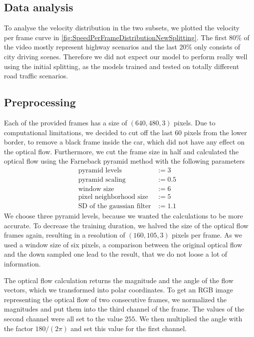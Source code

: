 \documentclass[conference]{IEEEtran}
\begin{document}
\subsection{Data analysis}
To analyse the velocity distribution in the two subsets, we plotted the velocity per frame curve in 
\cref{fig:SpeedPerFrameDistributionNewSplitting}. The first 80$\%$ of the video mostly represent highway scenarios 
and the last 20$\%$ only consists of city driving scenes. 
Therefore we did not expect our model to perform really well using the initial splitting, as the models trained and 
tested on totally different road traffic scenarios.

\subsection{Preprocessing}
Each of the provided frames has a size of $(640,480,3)$ pixels. Due to computational limitations, we decided to cut off the last 60 pixels from the lower border, to remove a black frame inside the car, which did not have any effect on the optical flow. Furthermore, we cut the frame size in half and calculated the optical flow using the Farneback pyramid method \cite{Farneback2003} with the following parameters
\begin{align*}
\text{pyramid levels} &:= 3\\
\text{pyramid scaling} &:= 0.5\\
\text{window size} &:= 6\\
\text{pixel neighborhood size} &:= 5\\
\text{SD of the gaussian filter} &:= 1.1
\end{align*}
We choose three pyramid levels, because we wanted the calculations to be more accurate. To decrease the training duration, we halved 
the size of the optical flow frames again, resulting in a resolution of
$(160,105,3)$ pixels per frame. As we used a window size of six pixels, a comparison between the original optical flow and the down 
sampled one lead to the result, that we do not loose a lot of information.

The optical flow calculation returns the magnitude and
the angle of the flow vectors, which we transformed into polar coordinates. To get an RGB image representing the
optical flow of two consecutive frames, we normalized the magnitudes and put them into the third channel of the frame. The values
of the second channel were all set to the value $255$. We then multiplied the angle with the factor $180/(2\pi)$ and set this value 
for the first channel.
\end{document}
